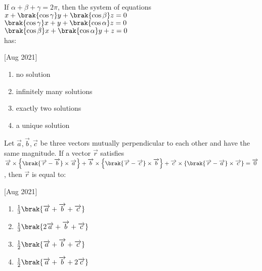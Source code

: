 \iffalse
	\title{2021}
	\author{AI24BTECH11003}
	\section{mcq-single}
\fi

    \item If $\alpha+\beta+\gamma=2\pi$, then the system of equations\\
    $x+\brak{\cos\gamma}y+\brak{\cos\beta}z=0$\\
    $\brak{\cos\gamma}x+y+\brak{\cos\alpha}z=0$\\
    $\brak{\cos\beta}x+\brak{\cos\alpha}y+z=0$\\
    has:
    
    \hfill[Aug 2021]

        \begin{multicols}{2}
            \begin{enumerate}
                \item no solution
                \item infinitely many solutions
                \item exactly two solutions
                \item a unique solution
            \end{enumerate}
        \end{multicols}

    \item Let $\overrightarrow{a},\overrightarrow{b},\overrightarrow{c}$ be three vectors mutually perpendicular to each other and have the same magnitude. If a vector $\overrightarrow{r}$ satisfies 
    $\overrightarrow{a}\times\left\{ \brak{\overrightarrow{r}-\overrightarrow{b}}\times\overrightarrow{a} \right\} + \overrightarrow{b}\times\left\{ \brak{\overrightarrow{r}-\overrightarrow{c}}\times\overrightarrow{b} \right\} + \overrightarrow{c}\times\left\{ \brak{\overrightarrow{r}-\overrightarrow{a}}\times\overrightarrow{c} \right\} = \overrightarrow{0}$, then $\overrightarrow{r}$ is equal to:
    
    \hfill[Aug 2021]

		\begin{multicols}{4}
			\begin{enumerate}
				\item $\frac{1}{3}\brak{\overrightarrow{a}+\overrightarrow{b}+\overrightarrow{c}}$
				\item $\frac{1}{3}\brak{2\overrightarrow{a}+\overrightarrow{b}+\overrightarrow{c}}$
				\item $\frac{1}{2}\brak{\overrightarrow{a}+\overrightarrow{b}+\overrightarrow{c}}$
				\item $\frac{1}{2}\brak{\overrightarrow{a}+\overrightarrow{b}+2\overrightarrow{c}}$
			\end{enumerate}
		\end{multicols}

